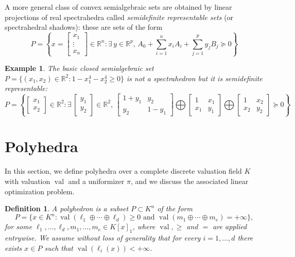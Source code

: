 \documentclass[a4paper,12pt]{article}
\newtheorem{definition}{Definition}
\newtheorem{example}{Example}
\newcommand{\R}{\mathbb{R}} %
\DeclareMathOperator{\val}{val}
\begin{document}
A more general class of convex semialgebraic sets are obtained by linear projections of real spectrahedra
called \emph{semidefinite representable sets} (or spectrahedral shadows): these are sets of the form
$$
P = \left\{x = \left[\begin{smallmatrix} x_1 \\ \vdots \\ x_n \end{smallmatrix}\right] \in \R^n : \exists\,y\in\R^p, \, A_0 + \sum_{i=1}^n x_i A_i + \sum_{j=1}^p y_j B_j \succeq 0\right\}
$$

\begin{example}
\label{fermat_quartic}
The basic closed semialgebraic set $P = \{(x_1,x_2) \in \R^2 : 1-x_1^4-x_2^4 \geq 0\}$ is not a spectrahedron
but it is semidefinite representable:
$$
P = \left\{\begin{bmatrix} x_1 \\ x_2 \end{bmatrix} \in \R^2 :
\exists\,
\begin{bmatrix} y_1 \\ y_2 \end{bmatrix} \in \R^2, \,
\begin{bmatrix}
  1+y_1 & y_2 \\
  y_2 & 1-y_1
\end{bmatrix}
\bigoplus
\begin{bmatrix}
  1 & x_1 \\
  x_1 & y_1
\end{bmatrix}
\bigoplus
\begin{bmatrix}
  1 & x_2 \\
  x_2 & y_2
\end{bmatrix}
\succeq 0
\right\}
$$
\end{example}


\section{Polyhedra}

In this section, we define polyhedra over a complete discrete valuation field $K$ with valuation $\val$ and a uniformizer $\pi$, and we discuss the associated linear optimization problem.

\begin{definition}
  \label{def_polyhedra}
  A \emph{polyhedron} is a subset $P \subset K^n$ of the form
  $$
  P = \{x \in K^n : \val(\ell_1 \oplus \cdots \oplus \ell_d) \geq 0 \text{ and }
  \val(m_1 \oplus \cdots \oplus m_e) = +\infty\},
  $$
  for some $\ell_1,\ldots,\ell_d,m_1,\ldots,m_e \in K[x]_1$, where $\val,\geq$ and $=$ are applied entrywise.
  We assume without loss of generality that for every $i=1,\ldots,d$ there exists $x \in P$ such that
  $\val(\ell_i(x))<+\infty$.
\end{definition}
\end{document}
